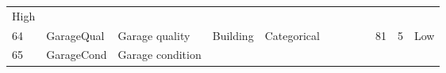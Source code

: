 \documentclass[11pt]{article}
\begin{document}
\begin{longtable}[]{@{}llllllllllll@{}}
\begin{minipage}[t]{0.04\columnwidth}
High\strut
\end{minipage}\tabularnewline
\begin{minipage}[t]{0.04\columnwidth}\raggedright\strut
64\strut
\end{minipage} & \begin{minipage}[t]{0.04\columnwidth}\raggedright\strut
GarageQual\strut
\end{minipage} & \begin{minipage}[t]{0.04\columnwidth}\raggedright\strut
Garage quality\strut
\end{minipage} & \begin{minipage}[t]{0.04\columnwidth}\raggedright\strut
Building\strut
\end{minipage} & \begin{minipage}[t]{0.04\columnwidth}\raggedright\strut
Categorical\strut
\end{minipage} & \begin{minipage}[t]{0.04\columnwidth}\raggedright\strut
\strut
\end{minipage} & \begin{minipage}[t]{0.04\columnwidth}\raggedright\strut
\strut
\end{minipage} & \begin{minipage}[t]{0.04\columnwidth}\raggedright\strut
\strut
\end{minipage} & \begin{minipage}[t]{0.04\columnwidth}\raggedright\strut
\strut
\end{minipage} & \begin{minipage}[t]{0.04\columnwidth}\raggedright\strut
81\strut
\end{minipage} & \begin{minipage}[t]{0.04\columnwidth}\raggedright\strut
5\strut
\end{minipage} & \begin{minipage}[t]{0.04\columnwidth}\raggedright\strut
Low\strut
\end{minipage}\tabularnewline
\begin{minipage}[t]{0.04\columnwidth}\raggedright\strut
65\strut
\end{minipage} & \begin{minipage}[t]{0.04\columnwidth}\raggedright\strut
GarageCond\strut
\end{minipage} & \begin{minipage}[t]{0.04\columnwidth}\raggedright\strut
Garage condition\strut
\end{minipage} & \begin{minipage}[t]{0.04\columnwidth}\raggedright\strut

\end{minipage}
\end{longtable}
\end{document}
